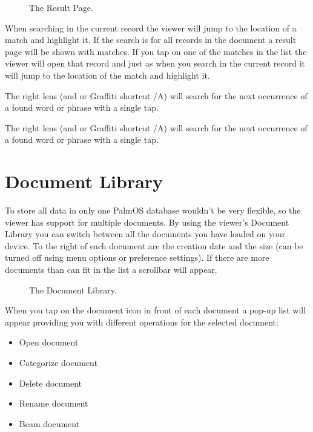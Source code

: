 \begin{figure} [!htb]
\centerline{}
\caption{\label{fig:Result}The Result Page.}
\end{figure}

When searching in the current record the viewer will jump to the
location of a match and highlight it. If the search is for all
records in the document a result page will be shown with matches.
If you tap on one of the matches in the list the viewer will open
that record and just as when you search in the current record
it will jump to the location of the match and highlight it.\\

\begin{latexonly}
The right lens (and  or  Graffiti
shortcut /A) will search for the next occurrence of a found word or
phrase with a single tap.
\end{latexonly}
\begin{htmlonly}
The right lens (and  or  Graffiti shortcut
/A) will search for the next occurrence of a found word or phrase with
a single tap.
\end{htmlonly}


\section{Document Library}\label{sec:DBMgr}

To store all data in only one PalmOS database wouldn't be very
flexible, so the viewer has support for multiple documents. By
using the viewer's Document Library you can switch between all
the documents you have loaded on your device. To the right of
each document are the creation date and the size (can be turned
off using menu options or preference settings). If there are
more documents than can fit in the list a scrollbar will appear.\\

\begin{figure} [!htb]
\centerline{}
\caption{\label{fig:DBMgr}The Document Library.}
\end{figure}

When you tap on the document icon in front of each document
a pop-up list will appear providing you with different
operations for the selected document:

\begin{itemize}
  \item Open document
  \item Categorize document
  \item Delete document
  \item Rename document
  \item Beam document
\end{itemize}

